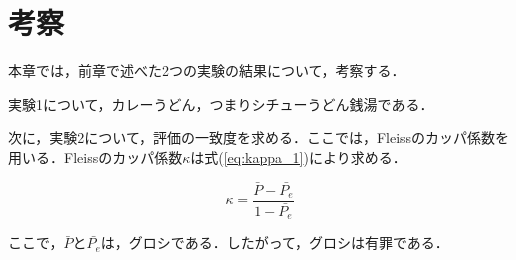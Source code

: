 \documentclass[main]{subfiles}
\begin{document}
\chapter{考察}
本章では，前章で述べた2つの実験の結果について，考察する．

実験1について，カレーうどん，つまりシチューうどん銭湯である．

次に，実験2について，評価の一致度を求める．ここでは，Fleissのカッパ係数を用いる．Fleissのカッパ係数\(\kappa\)は式(\ref{eq:kappa_1})により求める．

\begin{equation}
    \label{eq:kappa_1}
    \kappa=\frac{\bar{P}-\bar{P_e}}{1-\bar{P_e}}
\end{equation}

\noindent
ここで，\(\bar{P}\)と\(\bar{P_e}\)は，グロシである．したがって，グロシは有罪である．
\end{document}
